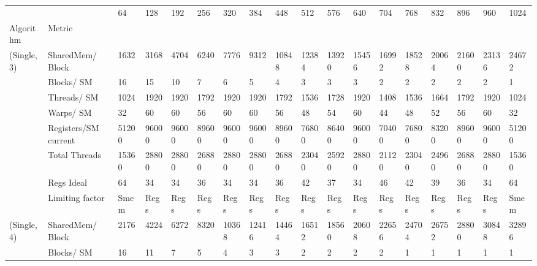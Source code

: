 \begin{tabular}{llllllllllllllllll}
\toprule
            &            &     64 &    128 &    192 &    256 &    320 &    384 &    448 &    512 &    576 &    640 &    704 &    768 &    832 &    896 &    960 &   1024 \\
Algorithm & Metric &        &        &        &        &        &        &        &        &        &        &        &        &        &        &        &        \\
\midrule
(Single, 3) & SharedMem/ Block &   1632 &   3168 &   4704 &   6240 &   7776 &   9312 &  10848 &  12384 &  13920 &  15456 &  16992 &  18528 &  20064 &  21600 &  23136 &  24672 \\
            & Blocks/ SM &     16 &     15 &     10 &      7 &      6 &      5 &      4 &      3 &      3 &      3 &      2 &      2 &      2 &      2 &      2 &      1 \\
            & Threads/ SM &   1024 &   1920 &   1920 &   1792 &   1920 &   1920 &   1792 &   1536 &   1728 &   1920 &   1408 &   1536 &   1664 &   1792 &   1920 &   1024 \\
            & Warps/ SM &     32 &     60 &     60 &     56 &     60 &     60 &     56 &     48 &     54 &     60 &     44 &     48 &     52 &     56 &     60 &     32 \\
            & Registers/SM current &  51200 &  96000 &  96000 &  89600 &  96000 &  96000 &  89600 &  76800 &  86400 &  96000 &  70400 &  76800 &  83200 &  89600 &  96000 &  51200 \\
            & Total Threads &  15360 &  28800 &  28800 &  26880 &  28800 &  28800 &  26880 &  23040 &  25920 &  28800 &  21120 &  23040 &  24960 &  26880 &  28800 &  15360 \\
            & Regs Ideal &     64 &     34 &     34 &     36 &     34 &     34 &     36 &     42 &     37 &     34 &     46 &     42 &     39 &     36 &     34 &     64 \\
            & Limiting factor &   Smem &   Regs &   Regs &   Regs &   Regs &   Regs &   Regs &   Regs &   Regs &   Regs &   Regs &   Regs &   Regs &   Regs &   Regs &   Smem \\
(Single, 4) & SharedMem/ Block &   2176 &   4224 &   6272 &   8320 &  10368 &  12416 &  14464 &  16512 &  18560 &  20608 &  22656 &  24704 &  26752 &  28800 &  30848 &  32896 \\
            & Blocks/ SM &     16 &     11 &      7 &      5 &      4 &      3 &      3 &      2 &      2 &      2 &      2 &      1 &      1 &      1 &      1 &      1 \\

\end{tabular}
